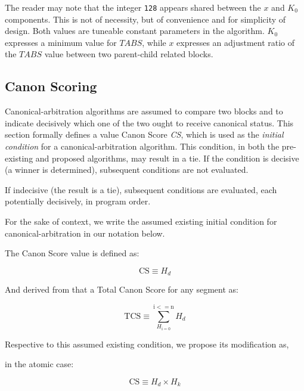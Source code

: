 \documentclass[11pt]{article}
\theoremstyle{plain}
\begin{document}
The reader may note that the integer \texttt{128} appears shared between the
$x$ and $K_0$ components.
This is not of necessity, but of convenience and for simplicity of design.
Both values are tuneable constant parameters in the algorithm.
$K_0$ expresses a minimum value for $TABS$, while $x$ expresses an adjustment
ratio of the $TABS$ value between two parent-child related blocks.


\subsection{\small{Canon Scoring}}

Canonical-arbitration algorithms are assumed to compare two blocks and to
indicate decisively which one of the two ought to receive canonical status.
This section formally defines a value Canon Score \textit{CS}, which is used as
the \textit{initial condition} for a canonical-arbitration algorithm.
This condition, in both the pre-existing and proposed algorithms, may result in a tie.
If the condition is decisive (a winner is determined), subsequent
conditions are not evaluated.

If indecisive (the result is a tie), subsequent conditions are evaluated, each
potentially decisively, in program order.

For the sake of context, we write the assumed existing initial condition for
canonical-arbitration in our notation below.

The Canon Score value is defined as:

\begin{equation}
\mathrm{CS} \equiv H_d
\end{equation}

And derived from that a Total Canon Score for any segment as:

\begin{equation}
\mathrm{TCS} \equiv \sum_{H_\mathrm{i = 0}}^{\mathrm{i <= n}} H_d
\end{equation}

Respective to this assumed existing condition, we propose its modification as,

in the atomic case:

\begin{equation}
\mathrm{CS} \equiv H_d \times H_k
\end{equation}
\end{document}
